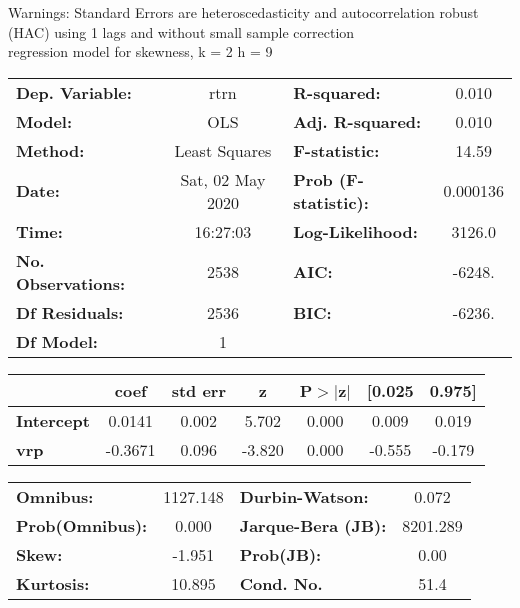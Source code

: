 Warnings: \newline
 [1] Standard Errors are heteroscedasticity and autocorrelation robust (HAC) using 1 lags and without small sample correction\\ 

regression model for skewness, k = 2 h = 9\begin{center}
\begin{tabular}{lclc}
\toprule
\textbf{Dep. Variable:}    &       rtrn       & \textbf{  R-squared:         } &     0.010   \\
\textbf{Model:}            &       OLS        & \textbf{  Adj. R-squared:    } &     0.010   \\
\textbf{Method:}           &  Least Squares   & \textbf{  F-statistic:       } &     14.59   \\
\textbf{Date:}             & Sat, 02 May 2020 & \textbf{  Prob (F-statistic):} &  0.000136   \\
\textbf{Time:}             &     16:27:03     & \textbf{  Log-Likelihood:    } &    3126.0   \\
\textbf{No. Observations:} &        2538      & \textbf{  AIC:               } &    -6248.   \\
\textbf{Df Residuals:}     &        2536      & \textbf{  BIC:               } &    -6236.   \\
\textbf{Df Model:}         &           1      & \textbf{                     } &             \\
\bottomrule
\end{tabular}
\begin{tabular}{lcccccc}
                   & \textbf{coef} & \textbf{std err} & \textbf{z} & \textbf{P$> |$z$|$} & \textbf{[0.025} & \textbf{0.975]}  \\
\midrule
\textbf{Intercept} &       0.0141  &        0.002     &     5.702  &         0.000        &        0.009    &        0.019     \\
\textbf{vrp}       &      -0.3671  &        0.096     &    -3.820  &         0.000        &       -0.555    &       -0.179     \\
\bottomrule
\end{tabular}
\begin{tabular}{lclc}
\textbf{Omnibus:}       & 1127.148 & \textbf{  Durbin-Watson:     } &    0.072  \\
\textbf{Prob(Omnibus):} &   0.000  & \textbf{  Jarque-Bera (JB):  } & 8201.289  \\
\textbf{Skew:}          &  -1.951  & \textbf{  Prob(JB):          } &     0.00  \\
\textbf{Kurtosis:}      &  10.895  & \textbf{  Cond. No.          } &     51.4  \\
\bottomrule
\end{tabular}
\end{center}

